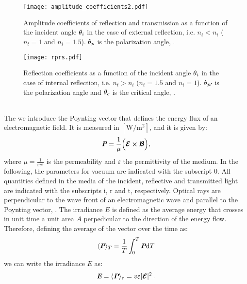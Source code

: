 \begin{figure}[h]
  \begin{minipage}[h]{0.4\textwidth}
    \texttt{[image: amplitude\_coefficients2.pdf]}
    \caption{Amplitude coefficients of reflection and transmission as a function of the incident angle $\theta_i$  in the case of external reflection, i.e. $n_t<n_i$
($n_t = 1$ and $n_i=1.5$). $\theta_p$ is the polarization angle, \cite{hecht1998hecht}.}
    \label{fig:coefficients}
  \end{minipage} \hspace{2.5cm}
  \begin{minipage}[h]{0.4\textwidth}
    \texttt{[image: rprs.pdf]}
    \caption{Reflection coefficients as a function of the incident angle $\theta_i$ in the case of internal reflection, i.e. $n_t>n_i$
($n_t = 1.5$ and $n_i=1$). $\theta_{p\prime}$ is the polarization angle and $\theta_c$ is the critical angle, \cite{hecht1998hecht}.}
   \label{fig:coefficients2}
 \end{minipage}
\end{figure}\\
\indent The  we introduce the Poynting vector  that defines the energy flux of an electromagnetic field. 
It is measured in $[\textrm{W}/\textrm{m}^2]$, and it is given by:
\begin{equation}
\textit{\textbf{P}} = \frac{1}{\mu}\Big(\boldsymbol{\mathcal{E}}\boldsymbol{\times} \boldsymbol{\mathcal{B}}\Big),
\end{equation}
where $\mu = \frac{1}{\varepsilon v^2}$ is the permeability and $\varepsilon$ the permittivity of the medium.
 In the following, the parameters for vacuum are indicated with the subscript $0$. All quantities defined in the media of the incident, reflective and transmitted light are indicated with the subscripts \textrm{i}, \textrm{r} and \textrm{t}, respectively. Optical rays are perpendicular to the wave front of an electromagnetic wave and parallel to the Poynting vector, \cite{jones2015optical}.
The irradiance $E$ is defined as the average energy that crosses in unit time a unit area $A$ perpedicular to the direction of the energy flow.
Therefore, defining the average of the vector  over the time as:
\begin{equation}
\langle \textit{\textbf{P}} \rangle_T = \frac{1}{T}\int_0^T \textit{\textbf{P}}\textrm{d}T
\end{equation}
we can write the irradiance $E$ as:
\begin{equation}
\textit{\textbf{E}} = \langle\textit{\textbf{P}}\rangle_{\tau} = v\varepsilon|\boldsymbol{\mathcal{E}}|^2 \,.
\end{equation}
